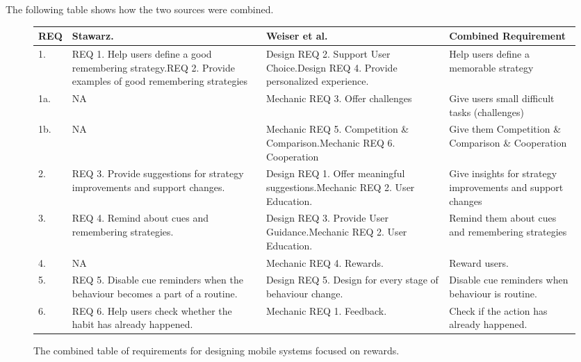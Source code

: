 The following table shows how the two sources \cite{thesis_kathy, article_taxonomy_motivational_affordances_meaningful} were combined.

\renewcommand{\arraystretch}{1.5} %
\begin{figure}[ht] %


\begin{center}
\begin{tabular}{ |p{.9cm}|p{4cm}|p{4.5cm}|p{4.5cm}| }
  \hline
  \textbf{REQ} & \textbf{Stawarz. \cite{thesis_kathy}} & \textbf{Weiser et al. \cite{article_taxonomy_motivational_affordances_meaningful}} & \textbf{Combined Requirement} \\ \hline %
  1.  & REQ 1. Help users define a good remembering strategy.\newline REQ 2. Provide examples of good remembering strategies & Design REQ 2. Support User Choice.\newline Design REQ 4. Provide personalized experience. & Help users define a memorable strategy \\ \hline
  1a. & N\/A & Mechanic REQ 3. Offer challenges & Give users small difficult tasks (challenges) \\ \hline
  1b. & N\/A & Mechanic REQ 5. Competition \& Comparison.\newline Mechanic REQ 6. Cooperation & Give them Competition \& Comparison \& Cooperation \\ \hline
  2.  & REQ 3. Provide suggestions for strategy improvements and support changes. & Design REQ 1. Offer meaningful suggestions.\newline Mechanic REQ 2. User Education. & Give insights for strategy improvements and support changes \\ \hline
  3.  & REQ 4. Remind about cues and remembering strategies. & Design REQ 3. Provide User Guidance.\newline Mechanic REQ 2. User Education. & Remind them about cues and remembering strategies \\ \hline
  4.  & N\/A & Mechanic REQ 4. Rewards. & Reward users. \\ \hline
  5.  & REQ 5. Disable cue reminders when the behaviour becomes a part of a routine. & Design REQ 5. Design for every stage of behaviour change. & Disable cue reminders when behaviour is routine. \\ \hline
  6.  & REQ 6. Help users check whether the habit has already happened. & Mechanic REQ 1. Feedback. & Check if the action has already happened. \\ \hline
\end{tabular}
\end{center}

    \caption{The combined table of requirements for designing mobile systems focused on rewards.}
    \label{fig:reqtable}
\end{figure}
\newpage

